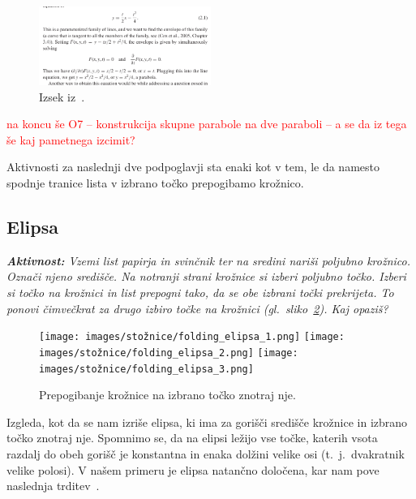 \begin{figure}[h]
    \centering
    \includegraphics[width=0.5\textwidth]{images/hull2020_envelope_way.png}
    \caption[Envelope]{Izsek iz~\cite[str.\ 32]{hull2020}.}
    \label{fig:envelope}
\end{figure}

\textcolor{red}{na koncu še O7 -- konstrukcija skupne parabole na dve paraboli -- a se da iz tega še kaj pametnega izcimit?}

Aktivnosti za naslednji dve podpoglavji sta enaki kot v tem, le da namesto spodnje tranice lista v izbrano točko prepogibamo krožnico.

\subsection{Elipsa}

\textit{\textbf{Aktivnost:} Vzemi list papirja in svinčnik ter na sredini nariši poljubno krožnico. Označi njeno središče. Na notranji strani krožnice si izberi poljubno točko. Izberi si točko na krožnici in list prepogni tako, da se obe izbrani točki prekrijeta. To ponovi čimvečkrat za drugo izbiro točke na krožnici (gl.\ sliko~\ref{fig:koraki_elipsa}). Kaj opaziš?}

\begin{figure}[h]
    \centering
    \texttt{[image: images/stožnice/folding\_elipsa\_1.png]}
    \texttt{[image: images/stožnice/folding\_elipsa\_2.png]}
    \texttt{[image: images/stožnice/folding\_elipsa\_3.png]}
    \caption[Prepogibanje elipse]{Prepogibanje krožnice na izbrano točko znotraj nje.}
    \label{fig:koraki_elipsa}
\end{figure}


Izgleda, kot da se nam izriše elipsa, ki ima za gorišči središče krožnice in izbrano točko znotraj nje. Spomnimo se, da na elipsi ležijo vse točke, katerih vsota razdalj do obeh gorišč je konstantna in enaka dolžini velike osi (t.\ j.\ dvakratnik velike polosi). V našem primeru je elipsa natančno določena, kar nam pove naslednja trditev~\cite[str.\ 60--61]{hull2013}.

